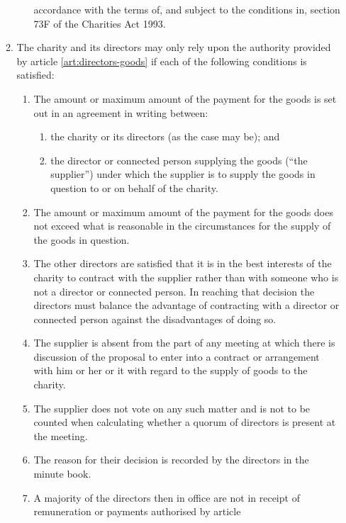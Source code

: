 \begin{enumerate}
\begin{enumerate}
\begin{enumerate}
      accordance with the terms of, and subject to the conditions in,
      section 73F of the Charities Act 1993.
    \end{enumerate}
  \item \label{goods}
    \label{scls:supply-goods} The charity and its directors may only
    rely upon the authority provided by article
    \ref{art:directors-goods} if each of the following conditions is
    satisfied:
    \begin{enumerate}
    \item
      The amount or maximum amount of the payment for the goods is set
      out in an agreement in writing between:
      \begin{enumerate}
      \item
        the charity or its directors (as the case may be); and
      \item
        the director or connected person supplying the goods
        (``the supplier'') under which the supplier is to supply the goods
        in question to or on behalf of the charity.
      \end{enumerate}
    \item
      The amount or maximum amount of the payment for the goods does not
      exceed what is reasonable in the circumstances for the supply of
      the goods in question.
    \item
      The other directors are satisfied that it is in the best interests
      of the charity to contract with the supplier rather than with
      someone who is not a director or connected person. In reaching that
      decision the directors must balance the advantage of contracting
      with a director or connected person against the disadvantages of
      doing so.
    \item
      The supplier is absent from the part of any meeting at which there
      is discussion of the proposal to enter into a contract or
      arrangement with him or her or it with regard to the supply of
      goods to the charity.
    \item
      The supplier does not vote on any such matter and is not to be
      counted when calculating whether a quorum of directors is present
      at the meeting.
    \item
      The reason for their decision is recorded by the directors in the
      minute book.
    \item
      A majority of the directors then in office are not in receipt of
      remuneration or payments authorised by article

\end{enumerate}
\end{enumerate}
\end{enumerate}
